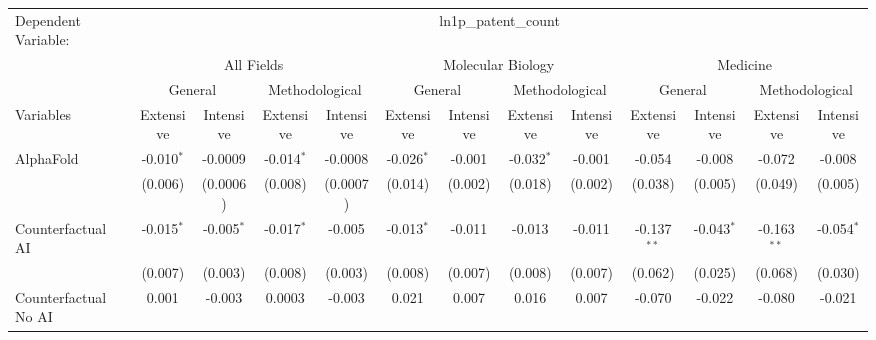 \begingroup
\centering
\begin{tabular}{lcccccccccccc}
   \tabularnewline \midrule \midrule
   Dependent Variable: & \multicolumn{12}{c}{ln1p\_patent\_count}\\
 & \multicolumn{4}{c}{All Fields} & \multicolumn{4}{c}{Molecular Biology} & \multicolumn{4}{c}{Medicine} \\
\cmidrule(lr){2-5} \cmidrule(lr){6-9} \cmidrule(lr){10-13}
 & \multicolumn{2}{c}{General} & \multicolumn{2}{c}{Methodological} & \multicolumn{2}{c}{General} & \multicolumn{2}{c}{Methodological} & \multicolumn{2}{c}{General} & \multicolumn{2}{c}{Methodological} \\
\cmidrule(lr){2-3} \cmidrule(lr){4-5} \cmidrule(lr){6-7} \cmidrule(lr){8-9} \cmidrule(lr){10-11} \cmidrule(lr){12-13}
Variables & \multicolumn{1}{c}{Extensive} & \multicolumn{1}{c}{Intensive} & \multicolumn{1}{c}{Extensive} & \multicolumn{1}{c}{Intensive} & \multicolumn{1}{c}{Extensive} & \multicolumn{1}{c}{Intensive} & \multicolumn{1}{c}{Extensive} & \multicolumn{1}{c}{Intensive} & \multicolumn{1}{c}{Extensive} & \multicolumn{1}{c}{Intensive} & \multicolumn{1}{c}{Extensive} & \multicolumn{1}{c}{Intensive} \\
\cmidrule(lr){1-1}\cmidrule(lr){2-2} \cmidrule(lr){3-3} \cmidrule(lr){4-4} \cmidrule(lr){5-5} \cmidrule(lr){6-6} \cmidrule(lr){7-7} \cmidrule(lr){8-8} \cmidrule(lr){9-9} \cmidrule(lr){10-10} \cmidrule(lr){11-11} \cmidrule(lr){12-12} \cmidrule(lr){13-13}
   AlphaFold                                & -0.010$^{*}$ & -0.0009      & -0.014$^{*}$ & -0.0008  & -0.026$^{*}$ & -0.001         & -0.032$^{*}$ & -0.001        & -0.054        & -0.008       & -0.072        & -0.008\\   
                                            & (0.006)      & (0.0006)     & (0.008)      & (0.0007) & (0.014)      & (0.002)        & (0.018)      & (0.002)       & (0.038)       & (0.005)      & (0.049)       & (0.005)\\   
   Counterfactual AI                        & -0.015$^{*}$ & -0.005$^{*}$ & -0.017$^{*}$ & -0.005   & -0.013$^{*}$ & -0.011         & -0.013       & -0.011        & -0.137$^{**}$ & -0.043$^{*}$ & -0.163$^{**}$ & -0.054$^{*}$\\   
                                            & (0.007)      & (0.003)      & (0.008)      & (0.003)  & (0.008)      & (0.007)        & (0.008)      & (0.007)       & (0.062)       & (0.025)      & (0.068)       & (0.030)\\   
   Counterfactual No AI                     & 0.001        & -0.003       & 0.0003       & -0.003   & 0.021        & 0.007          & 0.016        & 0.007         & -0.070        & -0.022       & -0.080        & -0.021\\   

\end{tabular}
